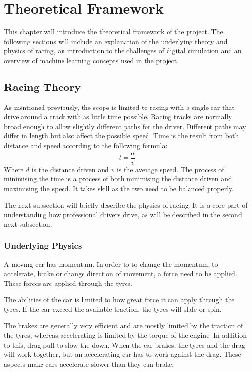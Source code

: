 \chapter{Theoretical Framework}
This chapter will introduce the theoretical framework of the project. The following sections will include an explanation of the underlying theory and physics of racing, an introduction to the challenges of digital simulation and an overview of machine learning concepts used in the project. 

\section{Racing Theory}
As mentioned previously, the scope is limited to racing with a single car that drive around a track with as little time possible. Racing tracks are normally broad enough to allow slightly different paths for the driver. Different paths may differ in length but also affect the possible speed. Time is the result from both distance and speed according to the following formula:
\begin{equation}
t = \frac{d}{v}
\end{equation}
Where $d$ is the distance driven and $v$ is the average speed. The process of minimising the time is a process of both minimising the distance driven and maximising the speed. It takes skill as the two need to be balanced properly.

The next subsection will briefly describe the physics of racing. It is a core part of understanding how professional drivers drive, as will be described in the second next subsection.

\subsection{Underlying Physics}
A moving car has momentum. In order to to change the momentum, to accelerate, brake or change direction of movement, a force need to be applied. These forces are applied through the tyres. 

The abilities of the car is limited to how great force it can apply through the tyres. If the car exceed the available traction, the tyres will slide or spin. 

The brakes are generally very efficient and are mostly limited by the traction of the tyres, whereas accelerating is limited by the torque of the engine. In addition to this, drag pull to slow the down. When the car brakes, the tyres and the drag will work together, but an accelerating car has to work against the drag. These aspects make cars accelerate slower than they can brake.

